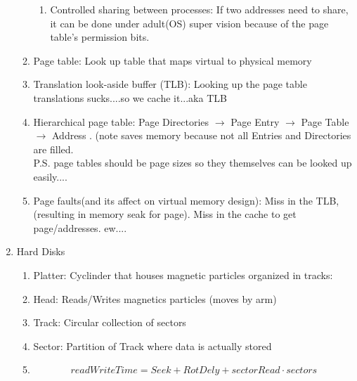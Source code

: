 \documentclass[12pt]{article}
\renewcommand{\=}[1]{\stackrel{#1}{=}} %
\theoremstyle{definition}
\theoremstyle{remark}
\begin{document}
\begin{center}
\begin{enumerate}
\begin{enumerate}
\begin{enumerate}
      \item Controlled sharing between processes: If two addresses
        need to share, it can be done under adult(OS) super vision
        because of the page table's permission bits.
      \end{enumerate}
    \item Page table: Look up table that maps virtual to physical memory
    \item Translation look-aside buffer (TLB): Looking up the page
      table translations sucks....so we cache it...aka TLB 
    \item Hierarchical page table: Page Directories $\rightarrow$ Page
      Entry $\rightarrow$ Page Table $\rightarrow$ Address . (note
      saves memory because not all Entries and Directories are
      filled.\\
      P.S. page tables should be page sizes so they themselves can be
      looked up easily....
    \item Page faults(and its affect on virtual memory design): Miss
      in the TLB, (resulting in memory seak for page). Miss in the
      cache to get page/addresses. ew....  
    \end{enumerate}
  \item Hard Disks
    \begin{enumerate}
    \item Platter: Cyclinder that houses magnetic particles organized
      in tracks:
    \item Head: Reads/Writes magnetics particles (moves by arm)
    \item Track: Circular collection of sectors
    \item Sector: Partition of Track where data is actually stored
    \item 
      \begin{equation}
        readWriteTime = Seek+RotDely +sectorRead\cdot sectors
      \end{equation}


\end{enumerate}
\end{enumerate}
\end{center}
\end{document}
